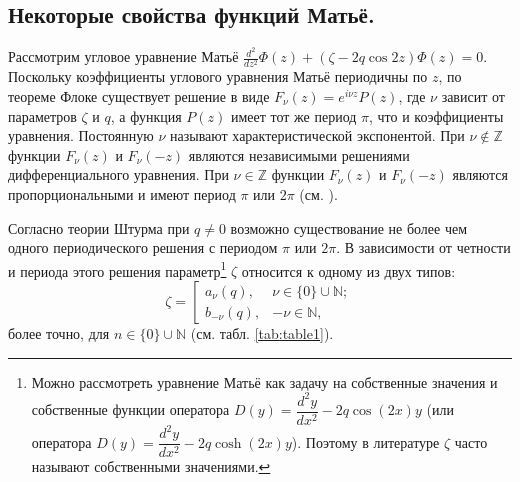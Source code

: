\subsection{Некоторые свойства функций Матьё.}\label{sec:ch2/sec1/subs2}
Рассмотрим угловое уравнение Матьё $\frac{d^2}{d z^2}\Phi(z) + (\zeta - 2q\cos{2 z})\Phi(z) =0$. 
Поскольку коэффициенты углового уравнения Матьё периодичны по $z$, по теореме Флоке \cite{wref2} существует решение в виде $F_\nu(z) = e^{i\nu z}P(z)$, где $\nu$ зависит от параметров $\zeta$ и $q$, а функция $P(z)$ имеет тот же период $\pi$, что и коэффициенты уравнения. Постоянную $\nu$ называют характеристической экспонентой. При $\nu \notin \mathbb{Z}$ функции $F_\nu(z)$ и $F_\nu(-z)$ являются независимыми решениями дифференциального уравнения. При $\nu \in \mathbb{Z}$ функции $F_\nu(z)$ и $F_\nu(-z)$ являются пропорциональными и имеют период $\pi$ или $2 \pi$ (см. \cite{wref2}).


Согласно теории Штурма при $q \neq 0$ возможно существование не более чем одного периодического решения с периодом $\pi$ или $2 \pi$. В зависимости от четности и периода этого решения параметр\footnote[2]{
		Можно рассмотреть уравнение Матьё как задачу на собственные значения и собственные функции оператора $D(y) = \dfrac{d^2y}{dx^2} - 2q\cos(2x) y$ (или оператора $D(y) = \dfrac{d^2y}{dx^2} - 2q\cosh(2x) y$). Поэтому в литературе  $\zeta$ часто называют собственными значениями.
}   $\zeta$ относится к одному из двух типов:
\[
\zeta = \left[
\begin{array}{cccc}
	a_\nu(q), 					& \nu \in \{0\} \cup \mathbb{N}; \\
	b_{-\nu}(q), 					& -\nu \in \mathbb{N},
\end{array}
\right.
\]
более точно, для $n\in\{0\}\cup\mathbb{N}$ (см. табл. \ref{tab:table1}).

